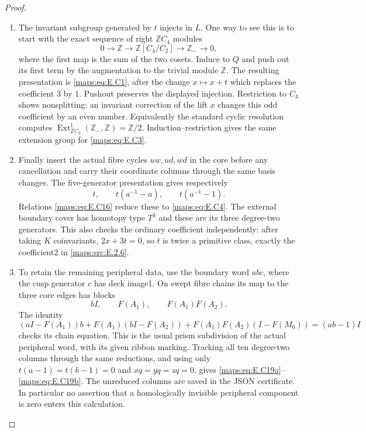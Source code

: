 \begin{proof}
\begin{enumerate}[label=\arabic*.,leftmargin=*]
\item The invariant subgroup generated by $t$ injects in
$L$. One way to see this is to start with the exact
sequence of right $\mathbb ZC_4$ modules
\[
 0\longrightarrow\mathbb Z\longrightarrow
 \mathbb Z[C_4/C_2]\longrightarrow\mathbb Z_-\longrightarrow0,
\]
where the first map is the sum of the two cosets.
Induce to $Q$ and push out its first term by the
augmentation to the trivial module $\mathbb Z$.
The resulting presentation is \eqref{maps:eq:E.C1}, after the
change $x\mapsto x+t$ which replaces the coefficient
$3$ by $1$. Pushout preserves the displayed injection.
Restriction to $C_4$ shows nonsplitting: an invariant
correction of the lift $x$ changes this odd coefficient
by an even number. Equivalently the standard cyclic
resolution computes
$\operatorname{Ext}^1_{\mathbb ZC_4}(\mathbb Z_-,\mathbb Z)
=\mathbb Z/2$. Induction--restriction gives the same
extension group for \eqref{maps:eq:E.C3}.

\item Finally insert the actual fibre cycles $uw,ud,wd$ in
the core before any cancellation and carry their
coordinate columns through the same basis changes.
The five-generator presentation gives respectively
\[
 t,\qquad t(a^{-1}-a),\qquad t(a^{-1}-1).
 \tag{E.C18}\label{maps:eq:E.C18}
\]
Relations \eqref{maps:eq:E.C16} reduce these to \eqref{maps:eq:E.C4}. The external
boundary cover has homotopy type $T^3$ and these are
its three degree-two generators. This also checks
the ordinary coefficient independently: after taking
$K$ coinvariants, $2x+3t=0$, so $t$ is twice a
primitive class, exactly the coefficient2 in \ref{maps:src:E.2.6}.

\item To retain the remaining peripheral data, use the
boundary word $abc$, where the cusp generator $c$
has deck image1. On swept fibre chains its map to
the three core edges has blocks
\[
                 bI,\qquad F(A_1),\qquad F(A_1)F(A_2).
 \tag{E.C21}\label{maps:eq:E.C21}
\]
The identity
\[
 (aI-F(A_1))b+F(A_1)(bI-F(A_2))
       +F(A_1)F(A_2)(I-F(M_0))=(ab-1)I
\]
checks its chain equation. This is the usual prism
subdivision of the actual peripheral word, with
its given ribbon marking. Tracking all ten
degree-two columns through the same reductions,
and using only $t(a-1)=t(b-1)=0$ and
$xq=yq=zq=0$, gives \eqref{maps:eq:E.C19a}--\eqref{maps:eq:E.C19b}.
The unreduced columns are saved in the JSON
certificate. In particular no assertion that a
homologically invisible peripheral component is
zero enters this calculation.
\end{enumerate}
\end{proof}

